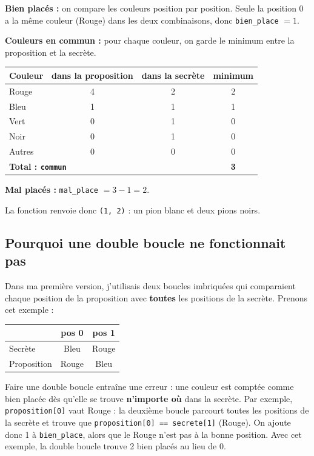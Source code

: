\documentclass[11pt,a4paper]{article}
\begin{document}
\textbf{Bien placés :} on compare les couleurs position par position.
Seule la position 0 a la même couleur (Rouge) dans les deux combinaisons,
donc \texttt{bien\_place} $= 1$.

\textbf{Couleurs en commun :} pour chaque couleur, on garde le minimum
entre la proposition et la secrète.

\begin{center}
\begin{tabular}{lccc}
\toprule
Couleur & dans la proposition & dans la secrète & minimum \\
\midrule
Rouge & 4 & 2 & 2 \\
Bleu  & 1 & 1 & 1 \\
Vert  & 0 & 1 & 0 \\
Noir  & 0 & 1 & 0 \\
Autres & 0 & 0 & 0 \\
\midrule
\multicolumn{3}{l}{\textbf{Total : \texttt{commun}}} & \textbf{3} \\
\bottomrule
\end{tabular}
\end{center}

\textbf{Mal placés :} \texttt{mal\_place} $= 3 - 1 = 2$.

La fonction renvoie donc \texttt{(1, 2)} : un pion blanc et deux pions noirs.

\subsection*{Pourquoi une double boucle ne fonctionnait pas}

Dans ma première version, j'utilisais deux boucles imbriquées qui
comparaient chaque position de la proposition avec \textbf{toutes} les
positions de la secrète. Prenons cet exemple :

\begin{center}
\begin{tabular}{lcc}
\toprule
 & pos 0 & pos 1 \\
\midrule
Secrète     & Bleu  & Rouge \\
Proposition & Rouge & Bleu  \\
\bottomrule
\end{tabular}
\end{center}

Faire une double boucle entraîne une erreur : une couleur est comptée comme bien placée dès qu'elle se trouve \textbf{n'importe où} dans la secrète. Par exemple, \texttt{proposition[0]} vaut Rouge : la deuxième boucle parcourt toutes les positions de la secrète et trouve que \texttt{proposition[0] == secrete[1]} (Rouge). On ajoute donc 1 à \texttt{bien\_place}, alors que le Rouge n'est pas à la bonne position. Avec cet exemple, la double boucle trouve 2 bien placés au lieu de 0.
\end{document}

